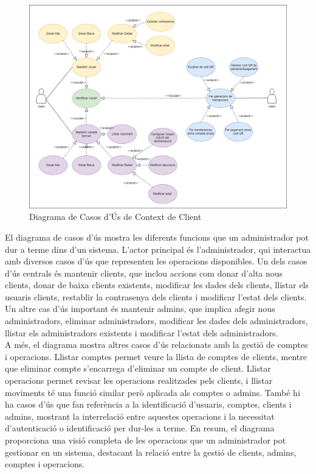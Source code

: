 \documentclass[a4paper,12pt,twoside]{ThesisStyle}
\begin{document}
\begin{figure}[h]
    \centering
    \includegraphics[width=1\textwidth]{imatges/diagrama caso de uso client.png}
    \caption{ Diagrama de Casos d'Ús de Context de Client }
    \label{fig:Diagrama de Casos d'Ús de Context de Client}
\end{figure}

El diagrama de casos d'ús mostra les diferents funcions que un administrador pot dur a terme dins d'un sistema. L'actor principal és l'administrador, qui interactua amb diversos casos d'ús que representen les operacions disponibles. Un dels casos d'ús centrals és mantenir clients, que inclou accions com donar d'alta nous clients, donar de baixa clients existents, modificar les dades dels clients, llistar els usuaris clients, restablir la contrasenya dels clients i modificar l'estat dels clients. Un altre cas d'ús important és mantenir admins, que implica afegir nous administradors, eliminar administradors, modificar les dades dels administradors, llistar els administradors existents i modificar l'estat dels administradors.\\

A més, el diagrama mostra altres casos d'ús relacionats amb la gestió de comptes i operacions. Llistar comptes permet veure la llista de comptes de clients, mentre que eliminar compte s'encarrega d'eliminar un compte de client. Llistar operacions permet revisar les operacions realitzades pels clients, i llistar moviments té una funció similar però aplicada als comptes o admins. També hi ha casos d'ús que fan referència a la identificació d'usuaris, comptes, clients i admins, mostrant la interrelació entre aquestes operacions i la necessitat d'autenticació o identificació per dur-les a terme. En resum, el diagrama proporciona una visió completa de les operacions que un administrador pot gestionar en un sistema, destacant la relació entre la gestió de clients, admins, comptes i operacions.\\
\end{document}
